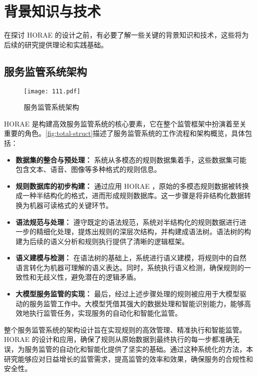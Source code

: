 \newpage

\section{背景知识与技术}

在探讨 HORAE 的设计之前，有必要了解一些关键的背景知识和技术，这些将为后续的研究提供理论和实践基础。

\subsection{服务监管系统架构}

\begin{figure}[ht]
    \centering
    \texttt{[image: 111.pdf]}
    \caption{\label{fig:total-struct}服务监管系统架构}
\end{figure}

 HORAE 是构建高效服务监管系统的核心要素，它在整个监管框架中扮演着至关重要的角色。\autoref{fig:total-struct}描述了服务监管系统的工作流程和架构概览，具体包括：

\begin{itemize}
    \item \textbf{数据集的整合与预处理：} 系统从多模态的规则数据集着手，这些数据集可能包含文本、语音、图像等多种格式的规则信息。
    \item \textbf{规则数据库的初步构建：} 通过应用 HORAE ，原始的多模态规则数据被转换成一种半结构化的格式，进而形成规则数据库。这一步骤是将非结构化数据转换为机器可读格式的关键环节。
    \item \textbf{语法规范与处理：} 遵守既定的语法规范，系统对半结构化的规则数据进行进一步的精细化处理，提炼出规则的深层次结构，并构建成语法树。语法树的构建为后续的语义分析和规则执行提供了清晰的逻辑框架。
    \item \textbf{语义建模与检测：} 在语法树的基础上，系统进行语义建模，将规则中的自然语言转化为机器可理解的语义表达。同时，系统执行语义检测，确保规则的一致性和无歧义性，避免潜在的逻辑矛盾。
    \item \textbf{大模型服务监管的实现：} 最后，经过上述步骤处理的规则被应用于大模型驱动的服务监管工作中。大模型凭借其强大的数据处理和智能识别能力，能够高效地执行监管任务，实现服务的自动化和智能化监管。
\end{itemize}

整个服务监管系统的架构设计旨在实现规则的高效管理、精准执行和智能监管。 HORAE 的设计和应用，确保了规则从原始数据到最终执行的每一步都准确无误，为服务监管的自动化和智能化提供了坚实的基础。通过这种系统化的方法，本研究能够应对日益增长的监管需求，提高监管的效率和效果，确保服务的合规性和安全性。

